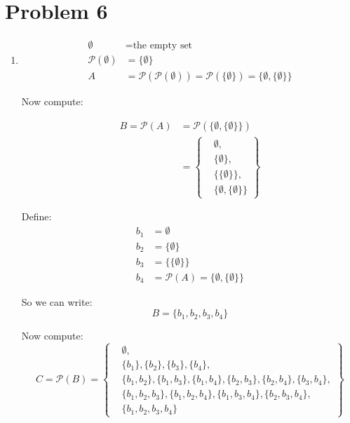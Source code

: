 \documentclass{article}
\begin{document}
\section*{Problem 6}
\begin{enumerate}
    \item %

    \begin{align*}
    \emptyset &= \text{the empty set} \\
    \mathcal{P}(\emptyset) &= \{ \emptyset \} \\
    A &= \mathcal{P}(\mathcal{P}(\emptyset)) = \mathcal{P}(\{ \emptyset \}) = \{ \emptyset, \{ \emptyset \} \}
    \end{align*}

    \vspace{1em}

    Now compute:

    \begin{align*}
    B = \mathcal{P}(A) &= \mathcal{P}(\{ \emptyset, \{ \emptyset \} \}) \\
    &= \left\{
        \begin{aligned}
        &\emptyset, \\
        &\{ \emptyset \}, \\
        &\{ \{ \emptyset \} \}, \\
        &\{ \emptyset, \{ \emptyset \} \}
        \end{aligned}
    \right\}
    \end{align*}

    \vspace{1em}

    Define:
    \[
    \begin{aligned}
    b_1 &= \emptyset \\
    b_2 &= \{ \emptyset \} \\
    b_3 &= \{ \{ \emptyset \} \} \\
    b_4 &= \mathcal{P}(A) = \{ \emptyset, \{ \emptyset \} \}
    \end{aligned}
    \]

    So we can write:
    \[
    B = \{ b_1, b_2, b_3, b_4 \}
    \]

    \vspace{1em}

    Now compute:
    \[
    C = \mathcal{P}(B) = \left\{
    \begin{aligned}
    & \emptyset, \\
    & \{ b_1 \}, \{ b_2 \}, \{ b_3 \}, \{ b_4 \}, \\
    & \{ b_1, b_2 \}, \{ b_1, b_3 \}, \{ b_1, b_4 \}, \{ b_2, b_3 \}, \{ b_2, b_4 \}, \{ b_3, b_4 \}, \\
    & \{ b_1, b_2, b_3 \}, \{ b_1, b_2, b_4 \}, \{ b_1, b_3, b_4 \}, \{ b_2, b_3, b_4 \}, \\
    & \{ b_1, b_2, b_3, b_4 \}
    \end{aligned}
    \right\}
    \]
    
\end{enumerate}
\end{document}
